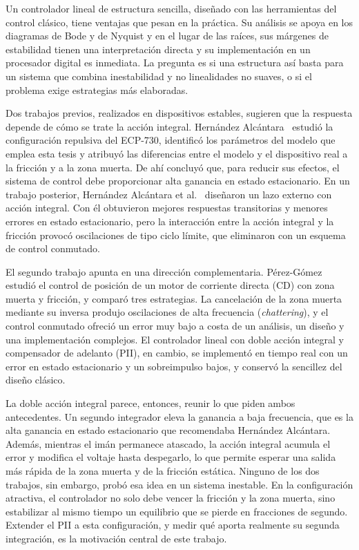 Un controlador lineal de estructura sencilla, diseñado con las herramientas del control clásico, tiene ventajas que pesan en la práctica. Su análisis se apoya en los diagramas de Bode y de Nyquist y en el lugar de las raíces, sus márgenes de estabilidad tienen una interpretación directa y su implementación en un procesador digital es inmediata. La pregunta es si una estructura así basta para un sistema que combina inestabilidad y no linealidades no suaves, o si el problema exige estrategias más elaboradas.

Dos trabajos previos, realizados en dispositivos estables, sugieren que la respuesta depende de cómo se trate la acción integral. Hernández Alcántara~\cite{diana_tesis} estudió la configuración repulsiva del ECP-730, identificó los parámetros del modelo que emplea esta tesis y atribuyó las diferencias entre el modelo y el dispositivo real a la fricción y a la zona muerta. De ahí concluyó que, para reducir sus efectos, el sistema de control debe proporcionar alta ganancia en estado estacionario. En un trabajo posterior, Hernández Alcántara et al.~\cite{alcantara} diseñaron un lazo externo con acción integral. Con él obtuvieron mejores respuestas transitorias y menores errores en estado estacionario, pero la interacción entre la acción integral y la fricción provocó oscilaciones de tipo ciclo límite, que eliminaron con un esquema de control conmutado.

El segundo trabajo apunta en una dirección complementaria. Pérez-Gómez~\cite{perez} estudió el control de posición de un motor de corriente directa (CD) con zona muerta y fricción, y comparó tres estrategias. La cancelación de la zona muerta mediante su inversa produjo oscilaciones de alta frecuencia (\emph{chattering}), y el control conmutado ofreció un error muy bajo a costa de un análisis, un diseño y una implementación complejos. El controlador lineal con doble acción integral y compensador de adelanto (PII), en cambio, se implementó en tiempo real con un error en estado estacionario y un sobreimpulso bajos, y conservó la sencillez del diseño clásico.

La doble acción integral parece, entonces, reunir lo que piden ambos antecedentes. Un segundo integrador eleva la ganancia a baja frecuencia, que es la alta ganancia en estado estacionario que recomendaba Hernández Alcántara. Además, mientras el imán permanece atascado, la acción integral acumula el error y modifica el voltaje hasta despegarlo, lo que permite esperar una salida más rápida de la zona muerta y de la fricción estática. Ninguno de los dos trabajos, sin embargo, probó esa idea en un sistema inestable. En la configuración atractiva, el controlador no solo debe vencer la fricción y la zona muerta, sino estabilizar al mismo tiempo un equilibrio que se pierde en fracciones de segundo. Extender el PII a esta configuración, y medir qué aporta realmente su segunda integración, es la motivación central de este trabajo.

